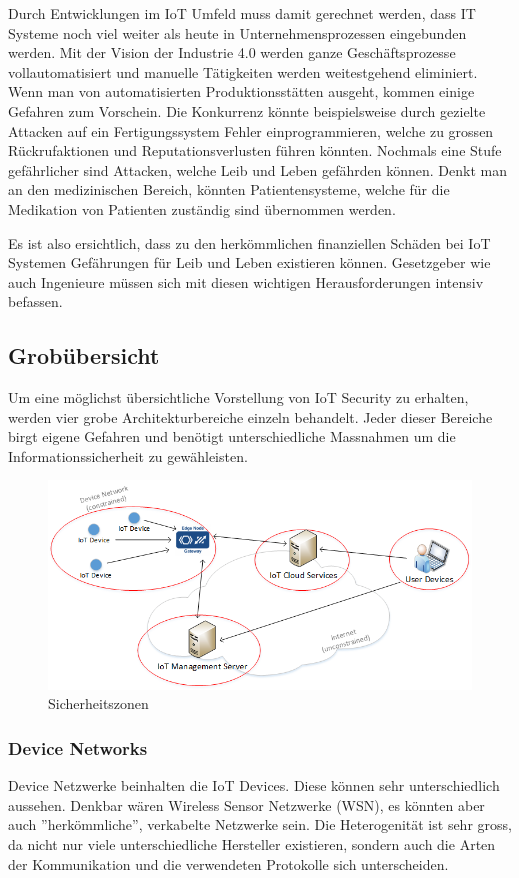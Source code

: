 Durch Entwicklungen im IoT Umfeld muss damit gerechnet werden, dass IT Systeme noch viel weiter als heute in Unternehmensprozessen eingebunden werden. Mit der Vision der Industrie 4.0 werden ganze Geschäftsprozesse vollautomatisiert und manuelle Tätigkeiten werden weitestgehend eliminiert. Wenn man von automatisierten Produktionsstätten ausgeht, kommen einige Gefahren zum Vorschein. Die Konkurrenz könnte beispielsweise durch gezielte Attacken auf ein Fertigungssystem Fehler einprogrammieren, welche zu grossen Rückrufaktionen und Reputationsverlusten führen könnten. Nochmals eine Stufe gefährlicher sind Attacken, welche Leib und Leben gefährden können. Denkt man an den medizinischen Bereich, könnten Patientensysteme, welche für die Medikation von Patienten zuständig sind übernommen werden.

Es ist also ersichtlich, dass zu den herkömmlichen finanziellen Schäden bei IoT Systemen Gefährungen für Leib und Leben existieren können. Gesetzgeber wie auch Ingenieure müssen sich mit diesen wichtigen Herausforderungen intensiv befassen.

\subsection{Grobübersicht}  
Um eine möglichst übersichtliche Vorstellung von IoT Security zu erhalten, werden vier grobe Architekturbereiche einzeln behandelt. Jeder dieser Bereiche birgt eigene Gefahren und benötigt unterschiedliche Massnahmen um die Informationssicherheit zu gewähleisten.
\begin{figure}[H]
\centering
\includegraphics[scale=0.8]{../02_Analyse/images/security_overview.png}
\caption{Sicherheitszonen}
\end{figure}
\subsubsection{Device Networks}
Device Netzwerke beinhalten die IoT Devices. Diese können sehr unterschiedlich aussehen. Denkbar wären Wireless Sensor Netzwerke (WSN), es könnten aber auch ''herkömmliche'', verkabelte Netzwerke sein. Die Heterogenität ist sehr gross, da nicht nur viele unterschiedliche Hersteller existieren, sondern auch die Arten der Kommunikation und die verwendeten Protokolle sich unterscheiden. 

